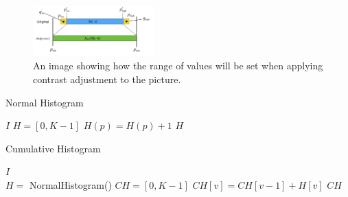 \documentclass[journal,transmag]{IEEEtran}
\begin{document}
\begin{figure}[h!]
\centering
\includegraphics[width=0.42\textwidth]{figures/contrAdj.png}
\caption{An image showing how the range of values will be set when applying contrast adjustment to the picture.}
\label{fig:contrAdj}
\end{figure}

\begin{algorithm}[bh!] %
	\caption{Normal Histogram}
	\label{alg:norm_hist}
	\begin{algorithmic}[1]
		 {$I$}
		\State
		\State $H = [0, K-1]$
		\State 
		\State $H(p) = H(p) + 1$
		\EndFor
		\State 
		\State
		\Return $H$
		\EndFunction
	\end{algorithmic}
\end{algorithm}
\begin{algorithm}[bh!]%
	\caption{Cumulative Histogram}
	\label{alg:cum_hist}
	\begin{algorithmic}[1]
		 {$I$}\\ 
		\State
		\State $H = $ NormalHistogram()
		\State $CH = [0, K-1]$
		\State
		\State $CH[v] = CH[v-1] + H[v]$
		\EndFor
		\State 
		\State
		\Return $CH$
		\EndFunction
	\end{algorithmic}
\end{algorithm}
\end{document}
